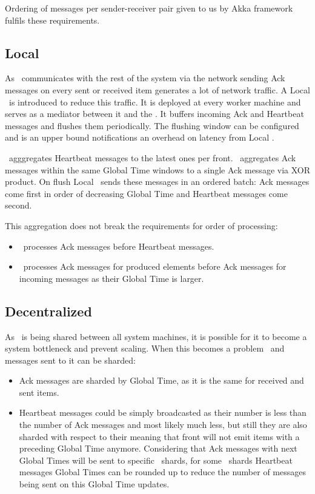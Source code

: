 Ordering of messages per sender-receiver pair given to us by Akka framework fulfils these requirements.

\subsection{Local \tracker\ }

As \tracker\ communicates with the rest of the system via the network sending Ack messages on every sent or received item generates a lot of network traffic. A Local \tracker\ is introduced to reduce this traffic. It is deployed at every worker machine and serves as a mediator between it and the \tracker. It buffers incoming Ack and Heartbeat messages and flushes them periodically. The flushing window can be configured and  is an upper bound notifications an overhead on latency from Local \tracker.

\tracker\ agggregates Heartbeat messages to the latest ones per front. \tracker\ aggregates Ack messages within the same Global Time windows to a single Ack message via XOR product. On flush Local \tracker\ sends these messages in an ordered batch: Ack messages come first in order of decreasing Global Time and Heartbeat messages come second.

This aggregation does not break the requirements for order of processing:
\begin{itemize}
	\item \tracker\ processes Ack messages before Heartbeat messages.
	\item \tracker\ processes Ack messages for produced elements before Ack messages for incoming messages as their Global Time is larger.
\end{itemize}

\subsection{Decentralized \tracker\ }

As \tracker\ is being shared between all system machines, it is possible for it to become a system bottleneck and prevent scaling. When this becomes a problem \tracker\ and messages sent to it can be sharded:
\begin{itemize}
	\item Ack messages are sharded by Global Time, as it is the same for received and sent items.
	\item Heartbeat messages could be simply broadcasted as their number is less than the number of Ack messages and most likely much less, but still they are also sharded with respect to their meaning that front will not emit items with a preceding Global Time anymore. Considering that Ack messages with next Global Times will be sent to specific \tracker\ shards, for some \tracker\ shards Heartbeat messages Global Times can be rounded up to reduce the number of messages being sent on this Global Time updates.
\end{itemize}

